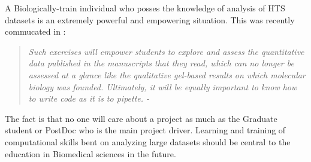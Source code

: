     A Biologically-train individual who posses the knowledge of analysis of HTS datasets is an extremely powerful and empowering situation. This was recently commucated in \citet{Plocik2013}:

    \begin{quote} %
      \itshape 
      Such exercises will empower students to explore and assess the quantitative data published in the manuscripts that they read, which can no longer be assessed at a glance like the qualitative gel-based results on which molecular biology was founded. Ultimately, it will be equally important to know how to write code as it is to pipette. - \citep{Plocik2013}
      \singlespacing
      \end{quote}

    The fact is that no one will care about a project as much as the Graduate student or PostDoc who is the main project driver. Learning and training of computational skills bent on analyzing large datasets should be central to the education in Biomedical sciences in the future.

\cleardoublepage